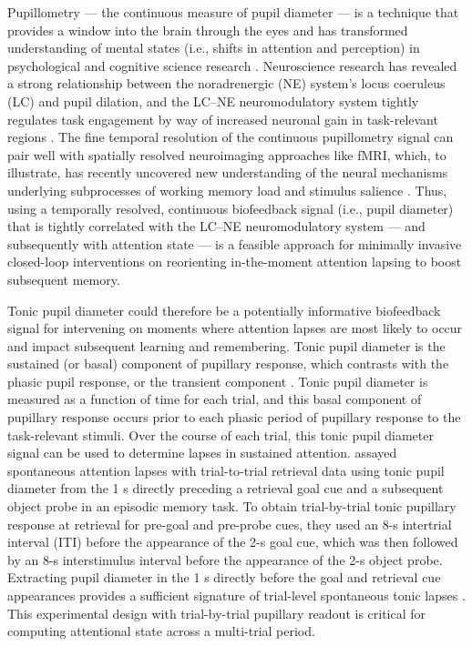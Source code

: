 Pupillometry --- the continuous measure of pupil diameter --- is a technique that provides a window into the brain through the eyes and has transformed understanding of mental states (i.e., shifts in attention and perception) in psychological and cognitive science research \parencite{laeng2012pupillometry,hess1960pupil,hess1964pupil,kahneman1966pupil}. Neuroscience research has revealed a strong relationship between the noradrenergic (NE) system's locus coeruleus (LC) and pupil dilation, and the LC--NE neuromodulatory system tightly regulates task engagement by way of increased neuronal gain in task-relevant regions \parencite{laeng2012pupillometry,murphy2011pupillometry,wilhelm1999pupillography,astonjones2005integrative,berridge2003locus,aston1981nonrepinephrine,sara2009locus,foote1980impulse}. The fine temporal resolution of the continuous pupillometry signal can pair well with spatially resolved neuroimaging approaches like fMRI, which, to illustrate, has recently uncovered new understanding of the neural mechanisms underlying subprocesses of working memory load and stimulus salience \parencite{fietz2021pupillometry}. Thus, using a temporally resolved, continuous biofeedback signal (i.e., pupil diameter) that is tightly correlated with the LC--NE neuromodulatory system --- and subsequently with attention state --- is a feasible approach for minimally invasive closed-loop interventions on reorienting in-the-moment attention lapsing to boost subsequent memory.

Tonic pupil diameter could therefore be a potentially informative biofeedback signal for intervening on moments where attention lapses are most likely to occur and impact subsequent learning and remembering. Tonic pupil diameter is the sustained (or basal) component of pupillary response, which contrasts with the phasic pupil response, or the transient component \parencite{beatty1982phasic,peysakhovich2017impact}. Tonic pupil diameter is measured as a function of time for each trial, and this basal component of pupillary response occurs prior to each phasic period of pupillary response to the task-relevant stimuli. Over the course of each trial, this tonic pupil diameter signal can be used to determine lapses in sustained attention. \textcite{madore2020memory} assayed spontaneous attention lapses with trial-to-trial retrieval data using tonic pupil diameter from the 1 s directly preceding a retrieval goal cue and a subsequent object probe in an episodic memory task. To obtain trial-by-trial tonic pupillary response at retrieval for pre-goal and pre-probe cues, they used an 8-s intertrial interval (ITI) before the appearance of the 2-s goal cue, which was then followed by an 8-s interstimulus interval before the appearance of the 2-s object probe. Extracting pupil diameter in the 1 s directly before the goal and retrieval cue appearances provides a sufficient signature of trial-level spontaneous tonic lapses \parencite{madore2020memory}. This experimental design with trial-by-trial pupillary readout is critical for computing attentional state across a multi-trial period.

